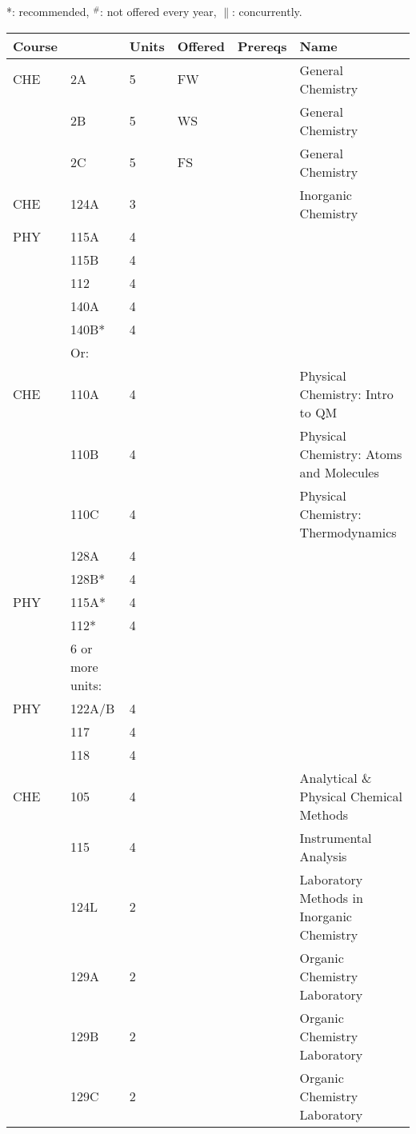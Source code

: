 \documentclass[12pt]{article}
\begin{document}
\vskip 0.25cm
\noindent
*: recommended, $^\#$: not offered every year, $\parallel$: concurrently.\\
\begin{tabular}{|llllll|}
\hline
Course & & Units & Offered & Prereqs & Name \\
\hline
\hline
CHE  & 2A      & 5 & FW & & General Chemistry \\
     & 2B      & 5 & WS & & General Chemistry \\
     & 2C      & 5 & FS & & General Chemistry \\
CHE  & 124A    & 3 & & & Inorganic Chemistry\\
\hline
\hline
PHY  & 115A   & 4 & & & \\
     & 115B   & 4 & & & \\
     & 112    & 4 & & & \\
     & 140A   & 4 & & & \\
     & 140B*   & 4 & & & \\
\hline
& Or: &&&& \\
\hline
CHE  & 110A   & 4 & & & Physical Chemistry: Intro to QM \\
     & 110B   & 4 & & & Physical Chemistry: Atoms and Molecules \\
     & 110C   & 4 & & & Physical Chemistry: Thermodynamics \\
     & 128A   & 4 & & & \\
     & 128B*   & 4 & & & \\
PHY  & 115A*  & 4 & & & \\
     & 112*   & 4 & & & \\
\hline
\hline
& 6 or more units: & & & & \\
PHY & 122A/B & 4 & & & \\
    & 117   & 4 & & & \\
    & 118   & 4 & & & \\
CHE & 105    & 4 & & & Analytical \& Physical Chemical Methods \\
    & 115    & 4 & & & Instrumental Analysis \\
    & 124L   & 2 & & & Laboratory Methods in Inorganic Chemistry \\
    & 129A   & 2 & & & Organic Chemistry Laboratory \\
    & 129B   & 2 & & & Organic Chemistry Laboratory \\
    & 129C   & 2 & & & Organic Chemistry Laboratory \\
\hline
\end{tabular}\\
\end{document}
